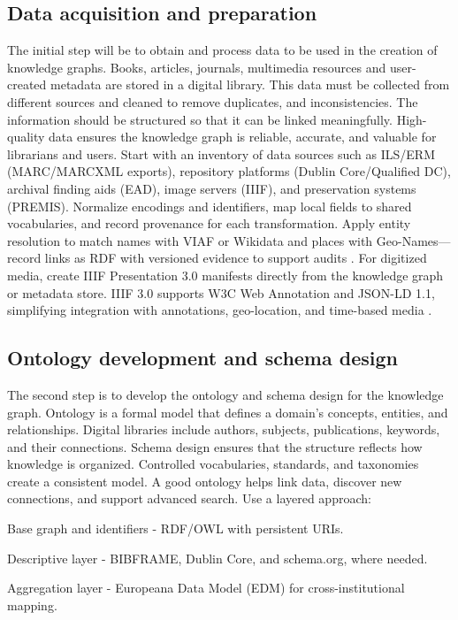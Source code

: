 \documentclass[12pt,a4paper]{article}
\begin{document}
\subsection{Data acquisition and preparation}
The initial step will be to obtain and process data to be used in the creation of knowledge graphs. Books, articles, journals, multimedia resources and user-created metadata are stored in a digital library. This data must be collected from different sources and cleaned to remove duplicates, and inconsistencies. The information should be structured so that it can be linked meaningfully. High-quality data ensures the knowledge graph is reliable, accurate, and valuable for librarians and users. Start with an inventory of data sources such as ILS/ERM (MARC/MARCXML exports), repository platforms (Dublin Core/Qualified DC), archival finding aids (EAD), image servers (IIIF), and preservation systems (PREMIS). Normalize encodings and identifiers, map local fields to shared vocabularies, and record provenance for each transformation. Apply entity resolution to match names with VIAF or Wikidata and places with Geo-Names—record links as RDF with versioned evidence to support audits \cite{isaac2013europeana}. For digitized media, create IIIF Presentation 3.0 manifests directly from the knowledge graph or metadata store. IIIF 3.0 supports W3C Web Annotation and JSON-LD 1.1, simplifying integration with annotations, geo-location, and time-based media \cite{iiifapi}.

\subsection{Ontology development and schema design}
The second step is to develop the ontology and schema design for the knowledge graph. Ontology is a formal model that defines a domain's concepts, entities, and relationships. Digital libraries include authors, subjects, publications, keywords, and their connections. Schema design ensures that the structure reflects how knowledge is organized. Controlled vocabularies, standards, and taxonomies create a consistent model. A good ontology helps link data, discover new connections, and support advanced search. Use a layered approach:

Base graph and identifiers - RDF/OWL with persistent URIs.

Descriptive layer - BIBFRAME, Dublin Core, and schema.org, where needed.

Aggregation layer - Europeana Data Model (EDM) for cross-institutional mapping.
\end{document}
